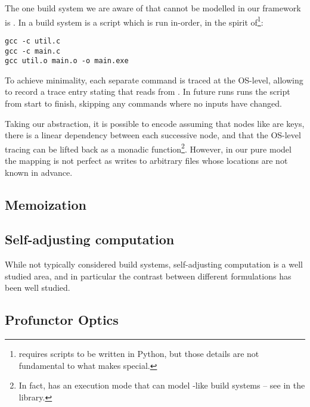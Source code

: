 The one build system we are aware of that cannot be modelled in our framework is \Fabricate \cite{fabricate}. In \Fabricate a build system is a script which is run in-order, in the spirit of\footnote{\Fabricate requires scripts to be written in Python, but those details are not fundamental to what makes \Fabricate special.}:

\begin{verbatim}
gcc -c util.c
gcc -c main.c
gcc util.o main.o -o main.exe
\end{verbatim}

To achieve minimality, each separate command is traced at the OS-level, allowing \Fabricate to record a trace entry stating that  reads from . In future runs \Fabricate runs the script from start to finish, skipping any commands where no inputs have changed.

Taking our abstraction, it is possible to encode \Fabricate assuming that nodes like  are keys, there is a linear dependency between each successive node, and that the OS-level tracing can be lifted back as a monadic  function\footnote{In fact, \Shake has an execution mode that can model \Fabricate{}-like build systems -- see  in the \Shake library.}. However, in our pure model the mapping is not perfect as  writes to arbitrary files whose locations are not known in advance.

\subsection{Memoization}\label{sec-related-memo}


\subsection{Self-adjusting computation}

While not typically considered build systems, self-adjusting computation is a well studied area, and in particular the contrast between different formulations has been well studied. 

\subsection{Profunctor Optics}\label{sec-related-optics}

